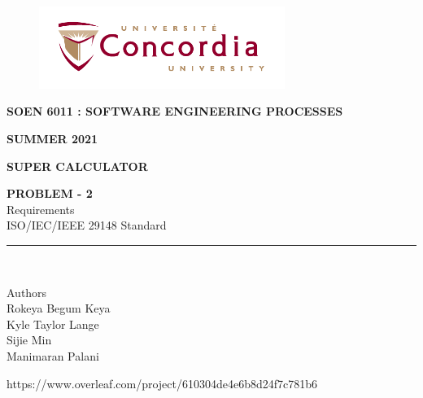 \documentclass[letterpaper, 11pt]{report}
\begin{document}
\begin{titlepage}
\vspace*{0.7in}
\begin{center}
\begin{figure}[htb]
\begin{center}
\includegraphics[width=8cm]{univ_logo}
\end{center}
\end{figure}
\vspace*{0.3in}
\begin{Large}
\textbf{SOEN 6011 : SOFTWARE ENGINEERING PROCESSES} \\
\end{Large}
\vspace*{0.1in}
\begin{Large}
\textbf{SUMMER 2021} \\
\end{Large}
\vspace*{0.9in}
\begin{Large}
\textbf{SUPER CALCULATOR} \\
\end{Large}
\vspace*{0.625in}
\begin{Large} 


\textbf{PROBLEM - 2} \\
Requirements\\\footnotesize{ISO/IEC/IEEE} 29148 Standard \\
\end{Large}
\vspace*{0.625in}
\rule{80mm}{0.1mm}\\
\vspace*{0.1in}
\begin{large}
Authors \\
\vspace*{0.1in}
Rokeya Begum Keya\\
\vspace*{0.1in}
Kyle Taylor Lange\\
\vspace*{0.1in}
Sijie Min\\
\vspace*{0.1in}
Manimaran Palani\\ 
\vspace*{0.3in}
\date{\normalsize\today} 
\end{large}
\end{center}
\begin{center}
https://www.overleaf.com/project/610304de4e6b8d24f7c781b6\end{center}
\end{titlepage}
\end{document}
